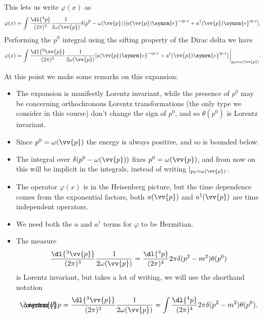 \documentclass[fleqn]{NotesClass}
\newcommand{\e}{\symrm{e}}
\newcommand{\hermit}{{\dagger}}
\newcommand\dbar{\ThisStyle{\ensurestackMath{%
            \stackengine{-.3\LMpt}{\SavedStyle \symrm{d}}{\SavedStyle\overbar{}%
                \mkern2.25mu}{O}{r}{F}{F}{L}}}}
\newcommand{\invariantmeasure}[1]{\dbar #1}
\newcommand{\heaviside}{\theta}
\begin{document}
    This lets us write \(\varphi(x)\) as
    \begin{equation}
        \varphi(x) = \int \frac{\dl{^4 p}}{(2\pi)^3} \frac{1}{2\omega(\vv{p})} \delta(p^0 - \omega(\vv{p})) [ a(\vv{p}) \e^{-ip\cdot x} + a^\hermit(\vv{p}) \e^{i p \cdot x} ].
    \end{equation}
    Performing the \(p^0\) integral using the sifting property of the Dirac delta we have
    \begin{equation}
        \varphi(x) = \int \frac{\dl{^3\vv{p}}}{(2\pi)^3} \frac{1}{2\omega(\vv{p})} [ a(\vv{p}) \e^{-ip\cdot x} + a^\hermit(\vv{p}) \e^{i p \cdot x} ] \, \bigg|_{p_0 = \omega(\vv{p})}.
    \end{equation}
    
    At this point we make some remarks on this expansion:
    \begin{itemize}
        \item The expansion is manifestly Lorentz invariant, while the presence of \(p^0\) may be concerning orthochronous Lorentz transformations (the only type we consider in this course) don't change the sign of \(p^0\), and so \(\heaviside(p^0)\) is Lorentz invariant.
        \item Since \(p^0 = \omega(\vv{p})\) the energy is always positive, and so is bounded below.
        \item The integral over \(\delta(p^0 - \omega(\vv{p}))\) fixes \(p^0 = \omega(\vv{p})\), and from now on this will be implicit in the integrals, instead of writing \(|_{p_0 = \omega(\vv{p})}\).
        \item The operator \(\varphi(x)\) is in the Heisenberg picture, but the time dependence comes from the exponential factors, both \(a(\vv{p})\) and \(a^\hermit(\vv{p})\) are time independent operators.
        \item We need both the \(a\) and \(a^\hermit\) terms for \(\varphi\) to be Hermitian.
        \item The measure
        \begin{equation}
            \frac{\dl{^3\vv{p}}}{(2\pi)^3} \frac{1}{2\omega(\vv{p})} = \frac{\dl{^4p}}{(2\pi)^4} 2\pi \delta(p^2 - m^2) \heaviside(p^0)
        \end{equation}
        is Lorentz invariant, but takes a lot of writing, we will use the shorthand notation
        \begin{equation}
            \invariantmeasure{p} = \frac{\dl{^3\vv{p}}}{(2\pi)^3} \frac{1}{2\omega(\vv{p})} = \int \frac{\dl{^4p}}{(2\pi)^4} 2\pi \delta(p^2 - m^2) \heaviside(p^0).
        \end{equation}
    \end{itemize}
    
\end{document}
